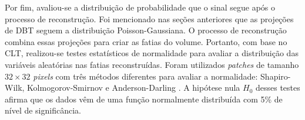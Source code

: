 Por fim, avaliou-se a distribuição de probabilidade que o sinal segue após o processo de reconstrução. Foi mencionado nas seções anteriores que as projeções de \acs{DBT} seguem a distribuição Poisson-Gaussiana. O processo de reconstrução combina essas projeções para criar as fatias do volume. Portanto, com base no \acs{CLT}, realizou-se testes estatísticos de normalidade para avaliar a distribuição das variáveis aleatórias nas fatias reconstruídas. Foram utilizados \textit{patches} de tamanho $32\times32$ \textit{pixels} com três métodos diferentes para avaliar a normalidade: Shapiro-Wilk, Kolmogorov-Smirnov e Anderson-Darling \cite{razali2011power}. A hipótese nula $H_{0}$ desses testes afirma que os dados vêm de uma função normalmente distribuída com 5\% de nível de significância.






 